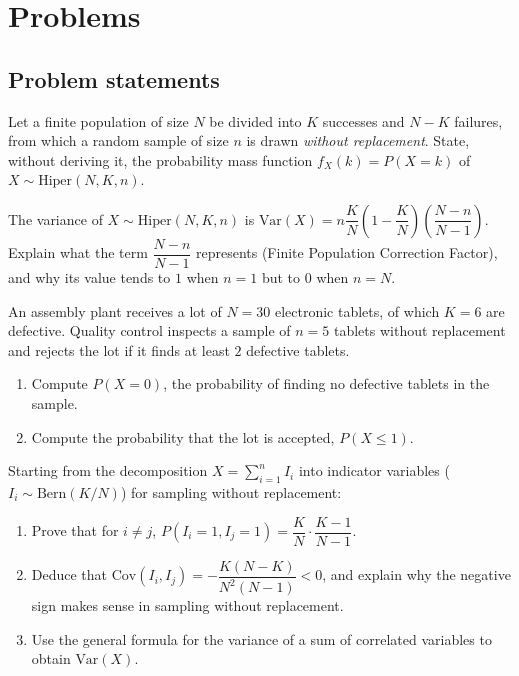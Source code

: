 \section*{Problems}

\subsection*{Problem statements}

\begin{problema}
	\label{prob:748a77d}
	Let a finite population of size $N$ be divided into $K$ successes and $N-K$ failures, from which a random sample of size $n$ is drawn \emph{without replacement}. State, without deriving it, the probability mass function $f_X(k)=P(X=k)$ of $X \sim \text{Hiper}(N,K,n)$.
\end{problema}

\begin{problema}
	\label{prob:5e6e8bf}
	The variance of $X \sim \text{Hiper}(N,K,n)$ is $\text{Var}(X) = n\dfrac{K}{N}\left(1-\dfrac{K}{N}\right)\left(\dfrac{N-n}{N-1}\right)$. Explain what the term $\dfrac{N-n}{N-1}$ represents (Finite Population Correction Factor), and why its value tends to $1$ when $n=1$ but to $0$ when $n=N$.
\end{problema}

\begin{problema}
	\label{prob:1651c98}
	An assembly plant receives a lot of $N=30$ electronic tablets, of which $K=6$ are defective. Quality control inspects a sample of $n=5$ tablets without replacement and rejects the lot if it finds at least $2$ defective tablets.
	\begin{enumerate}
		\item Compute $P(X=0)$, the probability of finding no defective tablets in the sample.
		\item Compute the probability that the lot is accepted, $P(X\le1)$.
	\end{enumerate}
\end{problema}

\begin{problema}
	\label{prob:64e9a8d}
	Starting from the decomposition $X=\sum_{i=1}^n I_i$ into indicator variables ($I_i\sim\text{Bern}(K/N)$) for sampling without replacement:
	\begin{enumerate}
		\item Prove that for $i\neq j$, $P(I_i=1,I_j=1) = \dfrac{K}{N}\cdot\dfrac{K-1}{N-1}$.
		\item Deduce that $\text{Cov}(I_i,I_j) = -\dfrac{K(N-K)}{N^2(N-1)} < 0$, and explain why the negative sign makes sense in sampling without replacement.
		\item Use the general formula for the variance of a sum of correlated variables to obtain $\text{Var}(X)$.
	\end{enumerate}
\end{problema}

